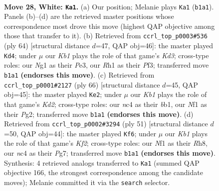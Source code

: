 \documentclass[11pt]{article}
\begin{document}
\clearpage

\begin{figure}[p]\centering
\begin{subfigure}{0.46\textwidth}\centering
\resizebox{\linewidth}{!}{%
\newchessgame
\chessboard[
  setfen={r1b1k3/5p2/4p3/6r1/pPn4p/3p4/R5PP/1K3NNR w q - 0 28},
  showmover=false,
  pgfstyle=straightmove, color=movearrow, markmove={b1-a1}
]}
\caption{}
\end{subfigure}\hfill
\begin{subfigure}{0.46\textwidth}\centering
\resizebox{\linewidth}{!}{%
\newchessgame
\chessboard[
  setfen={1r3k2/rP3p1p/6p1/3p4/p5PP/3KPP2/8/RR6 w - - 1 33},
  showmover=false,
  pgfstyle=straightmove, color=movearrow, markmove={d3-d4}
]}
\caption{}
\end{subfigure}
\\[4pt]
\begin{subfigure}{0.46\textwidth}\centering
\resizebox{\linewidth}{!}{%
\newchessgame
\chessboard[
  setfen={2r1r1k1/3R1ppp/8/4P3/1p1N4/1P2R3/3K2PP/1b6 w - - 1 34},
  showmover=false,
  pgfstyle=straightmove, color=movearrow, markmove={d2-e2}
]}
\caption{}
\end{subfigure}\hfill
\begin{subfigure}{0.46\textwidth}\centering
\resizebox{\linewidth}{!}{%
\newchessgame
\chessboard[
  setfen={r6r/3n1kpp/2pn4/3p1P2/pP6/2P2N1P/1PK5/R4B1R b - - 0 26},
  showmover=false,
  pgfstyle=straightmove, color=movearrow, markmove={f7-f6}
]}
\caption{}
\end{subfigure}
\caption{\textbf{Move 28, White: \texttt{Ka1}.} (a) Our position; Melanie plays \texttt{Ka1} (\texttt{b1a1}). Panels (b)--(d) are the retrieved master positions whose correspondence most drove this move (highest QAP objective among those that transfer to it). (b) Retrieved from \texttt{ccrl\_top\_p0003\#536} (ply 64) [structural distance $d$=47, QAP obj=46]: the master played \texttt{Kd4}; under $\mu$ our \emph{Kb1} plays the role of that game's \emph{Kd3}; cross-type roles: our \emph{N}g1 as their \emph{P}e3, our \emph{R}h1 as their \emph{P}f3; transferred move \texttt{b1a1} \textbf{(endorses this move)}. (c) Retrieved from \texttt{ccrl\_top\_p0001\#2127} (ply 66) [structural distance $d$=45, QAP obj=45]: the master played \texttt{Ke2}; under $\mu$ our \emph{Kb1} plays the role of that game's \emph{Kd2}; cross-type roles: our \emph{n}c4 as their \emph{b}b1, our \emph{N}f1 as their \emph{P}g2; transferred move \texttt{b1a1} \textbf{(endorses this move)}. (d) Retrieved from \texttt{ccrl\_top\_p0002\#3294} (ply 51) [structural distance $d$=50, QAP obj=44]: the master played \texttt{Kf6}; under $\mu$ our \emph{Kb1} plays the role of that game's \emph{Kf2}; cross-type roles: our \emph{N}f1 as their \emph{R}h8, our \emph{n}c4 as their \emph{P}g7; transferred move \texttt{b1a1} \textbf{(endorses this move)}. Synthesis: 4 retrieved analogs transferred to \texttt{Ka1} (summed QAP objective 166, the strongest correspondence among the candidate moves); Melanie committed it via the \texttt{search} selector.}
\label{fig:thought-m54}
\end{figure}
\end{document}
